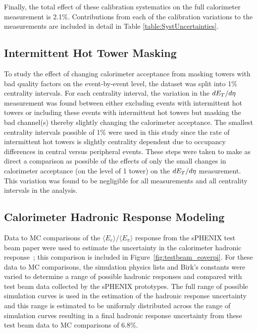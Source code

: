 Finally, the total effect of these calibration systematics on the full calorimeter \detdeta measurement is 2.1\%.
Contributions from each of the calibration variations to the \detdeta measurements are included in detail in Table \ref{table:SystUncertainties}.

\subsection{Intermittent Hot Tower Masking}
\label{hot_tower_syst}

To study the effect of changing calorimeter acceptance from masking towers with bad quality factors on the event-by-event level, the dataset was split into 1\% centrality intervals.
For each centrality interval, the variation in the $\mbox{$dE_{T}/d\eta$}$ measurement was found between either excluding events with intermittent hot towers or including these events with intermittent hot towers but masking the bad channel(s) thereby slightly changing the calorimeter acceptance. 
The smallest centrality intervals possible of 1\% were used in this study since the rate of intermittent hot towers is slightly centrality dependent due to occupancy differences in central versus peripheral events.
These steps were taken to make as direct a comparison as possible of the effects of only the small changes in calorimeter acceptance (on the level of 1 tower) on the $\mbox{$dE_{T}/d\eta$}$ measurement. 
This variation was found to be negligible for all measurements and all centrality intervals in the analysis. 

\subsection{Calorimeter Hadronic Response Modeling}

Data to MC comparisons of the $\langle E_{e} \rangle/\langle E_{\pi} \rangle$ response from the sPHENIX test beam paper were used to estimate the uncertainty in the calorimeter hadronic response~\cite{emcal_hcal_beamtest}; 
this comparison is included in Figure~\ref{fig:testbeam_eoverpi}. 
For these data to MC comparisons, the \geant simulation physics lists and Birk's constants were varied to determine a range of possible hadronic responses and compared with test beam data collected by the sPHENIX prototypes. 
The full range of possible simulation curves is used in the estimation of the hadronic response uncertainty and this range is estimated to be uniformly distributed across the range of simulation curves resulting in a final hadronic response uncertainty from these test beam data to MC comparisons of 6.8\%. 

